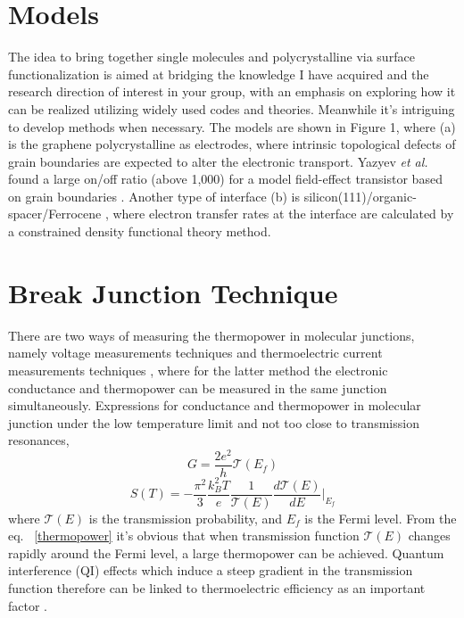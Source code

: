 \documentclass[prb,showpacs,10pt,superscriptaddress]{revtex4-1}
\begin{document}
\section{Models}
The idea to bring together single molecules and polycrystalline via surface functionalization is aimed at bridging the knowledge I have acquired and the research direction of interest in your group, with an emphasis on exploring how it can be realized utilizing widely used codes and theories. Meanwhile it's intriguing to develop methods when necessary. The models are shown in Figure 1, where (a) is the graphene polycrystalline as electrodes, where intrinsic topological defects of grain boundaries are expected to alter the electronic transport. Yazyev \textit{et al.} found a large on/off ratio (above 1,000) for a model field-effect transistor based on grain boundaries \cite{Electronic transport in polycrystalline graphene}. 
Another type of interface (b) is silicon(111)/organic-spacer/Ferrocene \cite{Ferrocene molecular architectures grafted on Si,XPS and electrochemical studies of ferrocene derivatives anchored on Si,Measurements of Electron-Transfer Rates of Charge-Storage}, where electron transfer rates at the interface are calculated by a constrained density functional theory method.    

\section{Break Junction Technique}
There are two ways of measuring the thermopower in molecular junctions, namely voltage measurements techniques \cite{thermoelectric in Molecular junction} and thermoelectric current measurements techniques \cite{Simultaneous Determination of Conductance and Thermopower of Single Molecule Junctions, Engineering the Thermopower of C60 Molecular Junctions}, where for the latter method the electronic conductance and thermopower can be measured in the same junction simultaneously.
Expressions for conductance and thermopower in molecular junction under the low temperature limit and not too close to transmission resonances,
\begin{equation}
 G= \dfrac{2e^2}{h}\mathcal{T}(E_{f})
\end{equation}
\begin{equation}
 S(T)= -\dfrac{\pi^2}{3}\dfrac{k_{B}^2T}{e}\dfrac{1}{\mathcal{T}(E)}\dfrac{d\mathcal{T}(E)}{dE}\Bigg |_{E_{f}}
 \label{thermopower}
\end{equation}
where $\mathcal{T}(E)$ is the transmission probability, and $E_{f}$ is the Fermi level. From the eq. ~\ref{thermopower} it's obvious that when transmission function $\mathcal{T}(E)$ changes rapidly around the Fermi level, a large thermopower can be achieved. Quantum interference (QI) effects which induce a steep gradient in the transmission function therefore can be linked to thermoelectric efficiency as an important factor \cite{controlling the transmission line shape and potentional thermoelectric applications,Giant Thermoelectric Effect from Transmission Supernodes}.
\end{document}
